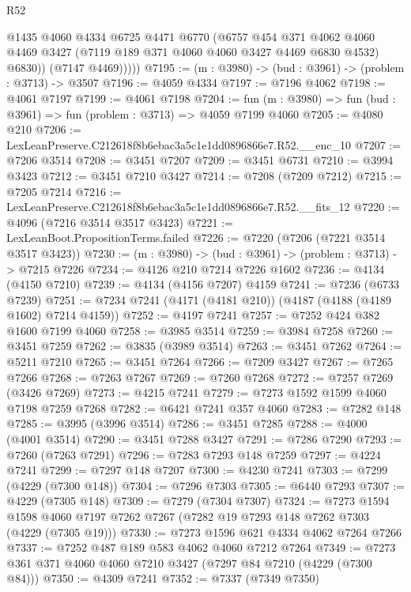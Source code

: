 \begin{lexlean}{R52}
\begin{coremodule}
              @1435
              @4060
              @4334
              @6725
              @4471
              @6770
              (@6757
                @454
                @371
                @4062
                @4060
                @4469
                @3427
                (@7119 @189 @371 @4060 @4060 @3427 @4469 @6830 @4532)
                @6830))
            (@7147 @4469)))))
@7195 := (m : @3980) -> (bud : @3961) -> (problem : @3713) -> @3507
@7196 := @4059 @4334
@7197 := @7196 @4062
@7198 := @4061 @7197
@7199 := @4061 @7198
@7204 := fun (m : @3980) => fun (bud : @3961) => fun (problem : @3713) => @4059 @7199 @4060
@7205 := @4080 @210
@7206 := LexLeanPreserve.C212618f8b6ebac3a5c1e1dd0896866e7.R52.__enc_10
@7207 := @7206 @3514
@7208 := @3451 @7207
@7209 := @3451 @6731
@7210 := @3994 @3423
@7212 := @3451 @7210 @3427
@7214 := @7208 (@7209 @7212)
@7215 := @7205 @7214
@7216 := LexLeanPreserve.C212618f8b6ebac3a5c1e1dd0896866e7.R52.__fits_12
@7220 := @4096 (@7216 @3514 @3517 @3423)
@7221 := LexLeanBoot.PropositionTerms.failed
@7226 := @7220 (@7206 (@7221 @3514 @3517 @3423))
@7230 := (m : @3980) -> (bud : @3961) -> (problem : @3713) -> @7215 @7226
@7234 := @4126 @210 @7214 @7226 @1602
@7236 := @4134 (@4150 @7210)
@7239 := @4134 (@4156 @7207) @4159
@7241 := @7236 (@6733 @7239)
@7251 := @7234 @7241 (@4171 (@4181 @210)) (@4187 (@4188 (@4189 @1602) @7214 @4159))
@7252 := @4197 @7241
@7257 := @7252 @424 @382 @1600 @7199 @4060
@7258 := @3985 @3514
@7259 := @3984 @7258
@7260 := @3451 @7259
@7262 := @3835 (@3989 @3514)
@7263 := @3451 @7262
@7264 := @5211 @7210
@7265 := @3451 @7264
@7266 := @7209 @3427
@7267 := @7265 @7266
@7268 := @7263 @7267
@7269 := @7260 @7268
@7272 := @7257 @7269 (@3426 @7269)
@7273 := @4215 @7241
@7279 := @7273 @1592 @1599 @4060 @7198 @7259 @7268
@7282 := @6421 @7241 @357 @4060
@7283 := @7282 @148
@7285 := @3995 (@3996 @3514)
@7286 := @3451 @7285
@7288 := @4000 (@4001 @3514)
@7290 := @3451 @7288 @3427
@7291 := @7286 @7290
@7293 := @7260 (@7263 @7291)
@7296 := @7283 @7293 @148 @7259
@7297 := @4224 @7241
@7299 := @7297 @148 @7207
@7300 := @4230 @7241
@7303 := @7299 (@4229 (@7300 @148))
@7304 := @7296 @7303
@7305 := @6440 @7293
@7307 := @4229 (@7305 @148)
@7309 := @7279 (@7304 @7307)
@7324 := @7273
    @1594
    @1598
    @4060
    @7197
    @7262
    @7267
    (@7282 @19 @7293 @148 @7262 @7303 (@4229 (@7305 @19)))
@7330 := @7273 @1596 @621 @4334 @4062 @7264 @7266
@7337 := @7252 @487 @189 @583 @4062 @4060 @7212 @7264
@7349 := @7273 @361 @371 @4060 @4060 @7210 @3427 (@7297 @84 @7210 (@4229 (@7300 @84)))
@7350 := @4309 @7241
@7352 := @7337 (@7349 @7350)

\end{coremodule}
\end{lexlean}
